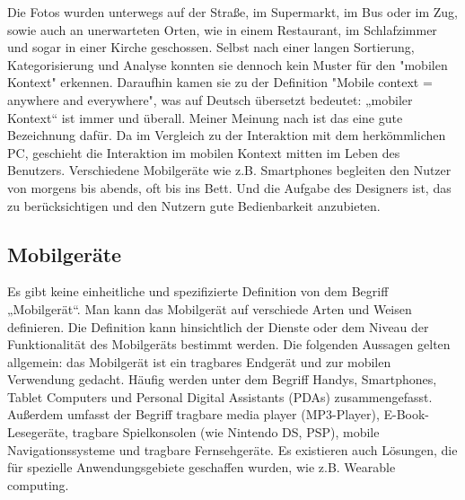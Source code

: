Die Fotos wurden unterwegs auf der Straße, im Supermarkt, im Bus oder im Zug, sowie auch an unerwarteten Orten, wie in einem Restaurant, im Schlafzimmer und sogar in einer Kirche geschossen. Selbst nach einer langen Sortierung, Kategorisierung und Analyse konnten sie dennoch kein Muster für den "mobilen Kontext" erkennen. Daraufhin kamen sie zu der Definition "Mobile context = anywhere and everywhere", was auf Deutsch übersetzt bedeutet: „mobiler Kontext“ ist immer und überall. Meiner Meinung nach ist das eine gute Bezeichnung dafür. Da im Vergleich zu der Interaktion mit dem herkömmlichen PC, geschieht die Interaktion im mobilen Kontext mitten im Leben des Benutzers. Verschiedene Mobilgeräte wie z.B. Smartphones  begleiten den Nutzer von morgens bis abends, oft bis ins Bett. Und die Aufgabe des Designers ist, das zu berücksichtigen und den Nutzern gute Bedienbarkeit anzubieten.

\subsection{Mobilgeräte} %
\label{sub:mobile_ger_te}
Es gibt keine einheitliche und spezifizierte Definition von dem Begriff „Mobilgerät“. Man kann das Mobilgerät auf verschiede Arten und Weisen definieren. Die Definition kann hinsichtlich der Dienste oder dem Niveau der Funktionalität des Mobilgeräts bestimmt werden. Die folgenden Aussagen gelten allgemein: das Mobilgerät ist ein tragbares Endgerät und zur mobilen Verwendung gedacht.  Häufig werden unter dem Begriff Handys, Smartphones, Tablet Computers und Personal Digital Assistants (PDAs) zusammengefasst. Außerdem umfasst der Begriff  tragbare media player (MP3-Player), E-Book-Lesegeräte, tragbare Spielkonsolen (wie Nintendo DS, PSP), mobile Navigationssysteme und tragbare Fernsehgeräte. Es existieren auch Lösungen, die für spezielle Anwendungsgebiete geschaffen wurden, wie z.B. Wearable computing. 

